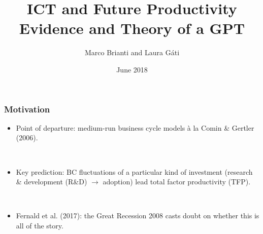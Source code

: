 \documentclass{beamer}
\author[Brianti, G\'ati]{Marco Brianti and Laura G\'ati}
\institute[Boston College]{Boston College}
\title[ICT \& medium-run TFP]{ICT and Future Productivity \\
Evidence and Theory of a GPT}
\date{June 2018}
\begin{document}
\begin{frame}

\maketitle


\end{frame}





\begin{frame}
	\frametitle{Motivation}
	\label{motivation}
	
	\begin{itemize}
		
		\item Point of departure: medium-run business cycle models \`a la Comin \& Gertler (2006).
		
		\
		
		\item Key prediction: BC fluctuations of a particular kind of investment (research \& development (R\&D) $\rightarrow$ adoption) lead total factor productivity (TFP).
		
		\
		
	\item Fernald et al. (2017): the Great Recession 2008 casts doubt on whether this is all of the story.
	
	\
	
	
	\end{itemize} 
	
		\
	
\hyperlink{wrong_timing}{}	

\end{frame}
\end{document}
